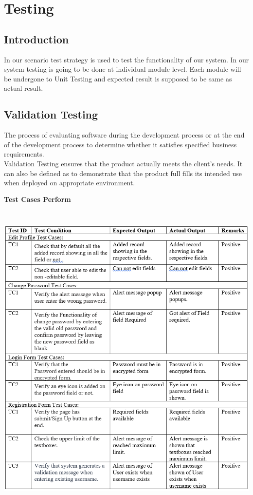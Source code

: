 \chapter{Testing}


\section{Introduction}
In our scenario test strategy is used to test the functionality of our system.  
In our system testing is going to be done at individual module level. Each module will be undergone to Unit Testing and expected result is supposed to be same as actual result.\\


\section{Validation Testing}
The process of evaluating software during the development process or at the end of the development process to determine whether it satisfies specified business requirements.\\
Validation Testing ensures that the product actually meets the client's needs. It can also be defined as to demonstrate that the product full fills its intended use when deployed on appropriate environment.\\

\pagebreak

\textbf{Test Cases Perform}
\begin{center}
\includegraphics[height=16cm,width=14cm]{ch7/tc.png}
\end{center}



 